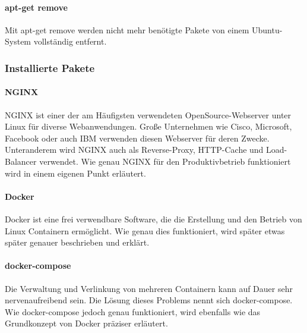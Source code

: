 \hypertarget{apt-get-remove}{%
\paragraph{apt-get remove}\label{apt-get-remove}}

Mit apt-get remove werden nicht mehr benötigte Pakete von einem
Ubuntu-System vollständig entfernt.

\hypertarget{installierte-pakete}{%
\subsubsection{Installierte Pakete}\label{installierte-pakete}}

\hypertarget{nginx}{%
\paragraph{NGINX}\label{nginx}}

NGINX ist einer der am Häufigsten verwendeten OpenSource-Webserver unter
Linux für diverse Webanwendungen. Große Unternehmen wie Cisco,
Microsoft, Facebook oder auch IBM verwenden diesen Webserver für deren
Zwecke. Unteranderem wird NGINX auch als Reverse-Proxy, HTTP-Cache und
Load-Balancer verwendet. Wie genau NGINX für den Produktivbetrieb
funktioniert wird in einem eigenen Punkt
 erläutert.

\hypertarget{docker}{%
\paragraph{Docker}\label{docker}}

Docker ist eine frei verwendbare Software, die die Erstellung und den
Betrieb von Linux Containern ermöglicht. Wie genau dies funktioniert,
wird später etwas später 
genauer beschrieben und erklärt.

\hypertarget{docker-compose}{%
\paragraph{docker-compose}\label{docker-compose}}

Die Verwaltung und Verlinkung von mehreren Containern kann auf Dauer
sehr nervenaufreibend sein. Die Lösung dieses Problems nennt sich
docker-compose. Wie docker-compose jedoch genau funktioniert, wird
ebenfalls wie das Grundkonzept von Docker
 präziser erläutert.

